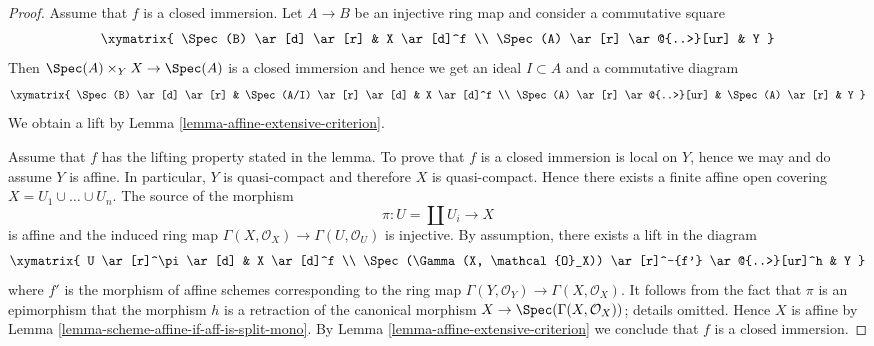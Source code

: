 \begin{proof}
Assume that $f$ is a closed immersion. Let $A \to B$ be an injective ring map
and consider a commutative square
$$
\xymatrix{
\Spec(B) \ar[d] \ar[r]  & X \ar[d]^f \\
\Spec(A) \ar[r] \ar@{..>}[ur] & Y
}
$$
Then $\Spec(A) \times_Y X \to \Spec(A)$ is a closed immersion and
hence we get an ideal $I \subset A$ and a commutative diagram
$$
\xymatrix{
\Spec(B) \ar[d] \ar[r] & \Spec(A/I) \ar[r] \ar[d] & X \ar[d]^f \\
\Spec(A) \ar[r] \ar@{..>}[ur] & \Spec(A) \ar[r] & Y
}
$$
We obtain a lift by Lemma \ref{lemma-affine-extensive-criterion}.

\medskip\noindent
Assume that $f$ has the lifting property stated in the lemma.
To prove that $f$ is a closed immersion is local on $Y$,
hence we may and do assume $Y$ is affine.
In particular, $Y$ is quasi-compact and therefore $X$ is quasi-compact.
Hence there exists a finite affine open covering $X = U_1 \cup \ldots \cup U_n$.
The source of the morphism
$$
\pi : U = \coprod U_i \longrightarrow X
$$
is affine and the induced ring map
$\Gamma(X, \mathcal{O}_X) \to \Gamma(U, \mathcal{O}_U)$
is injective. By assumption, there exists a lift in the diagram
$$
\xymatrix{
U \ar[r]^\pi \ar[d] & X \ar[d]^f \\
\Spec(\Gamma(X, \mathcal{O}_X)) \ar[r]^-{f'} \ar@{..>}[ur]^h & Y
}
$$
where $f'$ is the morphism of affine schemes corresponding to the 
ring map $\Gamma(Y, \mathcal{O}_Y) \to \Gamma(X, \mathcal{O}_X)$.
It follows from the fact that $\pi$ is an epimorphism
that the morphism $h$ is a retraction of the canonical morphism
$X \to \Spec(\Gamma(X, \mathcal{O}_X))$; details omitted. Hence $X$ is affine by
Lemma \ref{lemma-scheme-affine-if-aff-is-split-mono}.
By Lemma \ref{lemma-affine-extensive-criterion} we
conclude that $f$ is a closed immersion.
\end{proof}












